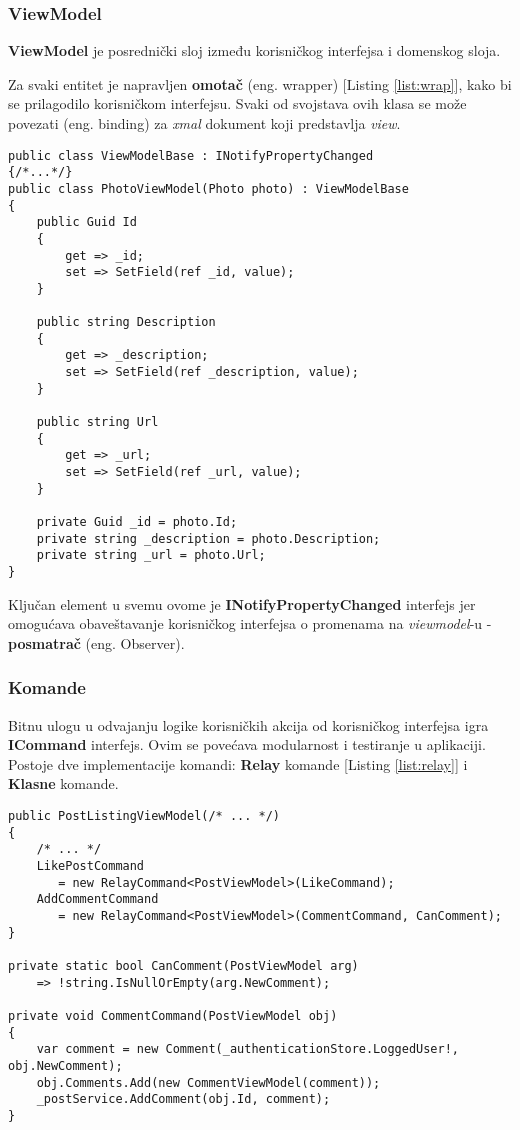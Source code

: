 \subsubsection*{ViewModel}
\par \textbf{ViewModel} je posrednički sloj između korisničkog interfejsa i domenskog sloja.
\par Za svaki entitet je napravljen \textbf{omotač} (eng. wrapper) [Listing \ref{list:wrap}], kako bi se prilagodilo korisničkom interfejsu. Svaki od svojstava ovih klasa se može povezati
(eng. binding) za \textit{xmal} dokument koji predstavlja \textit{view}. 
\begin{lstlisting}[caption={Primer ViewModel omotača}, captionpos=b, label=list:wrap]
public class ViewModelBase : INotifyPropertyChanged 
{/*...*/}
public class PhotoViewModel(Photo photo) : ViewModelBase
{
    public Guid Id
    {
        get => _id;
        set => SetField(ref _id, value);
    }

    public string Description
    {
        get => _description;
        set => SetField(ref _description, value);
    }

    public string Url
    {
        get => _url;
        set => SetField(ref _url, value);
    }

    private Guid _id = photo.Id;
    private string _description = photo.Description;
    private string _url = photo.Url;
}
\end{lstlisting}
\par Ključan element u svemu ovome je  \textbf{INotifyPropertyChanged} interfejs jer 
omogućava obaveštavanje korisničkog interfejsa o promenama na \textit{viewmodel}-u - \textbf{posmatrač} (eng. Observer).
\subsubsection*{Komande}
\par Bitnu ulogu u odvajanju logike korisničkih akcija od korisničkog interfejsa igra \textbf{ICommand} interfejs. Ovim se povećava modularnost i testiranje u 
aplikaciji. Postoje dve implementacije komandi: \textbf{Relay} komande [Listing \ref{list:relay}] i \textbf{Klasne} komande.  
\begin{lstlisting}[caption={Primer \textit{relay} komande za dodavanje komentara}, captionpos=b, label=list:relay]
public PostListingViewModel(/* ... */)
{
    /* ... */
    LikePostCommand 
       = new RelayCommand<PostViewModel>(LikeCommand);
    AddCommentCommand 
       = new RelayCommand<PostViewModel>(CommentCommand, CanComment);
}

private static bool CanComment(PostViewModel arg) 
    => !string.IsNullOrEmpty(arg.NewComment);

private void CommentCommand(PostViewModel obj)
{
    var comment = new Comment(_authenticationStore.LoggedUser!, obj.NewComment);
    obj.Comments.Add(new CommentViewModel(comment));
    _postService.AddComment(obj.Id, comment);
}
\end{lstlisting}
